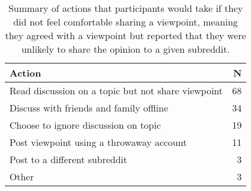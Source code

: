 \begin{table}[hb!]
    \centering
    \caption{Summary of actions that participants would take if they did not feel comfortable sharing a viewpoint, meaning they agreed with a viewpoint but reported that they were unlikely to share the opinion to a given subreddit.}
    \begin{tabular}{lr}
    \toprule
    \textbf{Action} &  \textbf{N}\\
    \midrule
    Read discussion on a topic but not share viewpoint & 68 \\
    Discuss with friends and family offline & 34 \\
    Choose to ignore discussion on topic & 19 \\
    Post viewpoint using a throwaway account & 11 \\
    Post to a different subreddit & 3 \\
    Other & 3 \\
    \bottomrule
    \end{tabular}

    \label{tab:otheractions}
\end{table}
